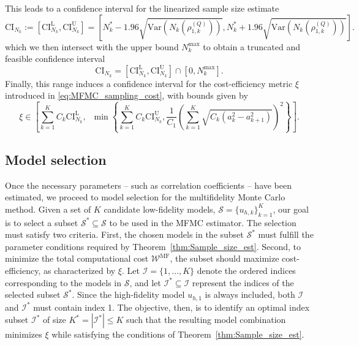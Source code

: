 %
This leads to a confidence interval for the linearized sample size estimate
%
\[
\text{CI}_{N_k} := \left[\text{CI}_{N_k}^{\text{L}},\text{CI}_{N_k}^{\text{U}}\right]=\left[N_k^*-1.96\sqrt{\text{Var}\left(N_k\left(\rho_{1,k}^{(Q)}\right)\right)}, N_k^*+1.96\sqrt{\text{Var}\left(N_k\left(\rho_{1,k}^{(Q)}\right)\right)}\right].
\]
%
which we then intersect with the upper bound $N_k^{\text{max}}$ to obtain a truncated and feasible confidence interval
%
\[
\text{CI}_{N_k} = \left[\text{CI}_{N_k}^{\text{L}},\text{CI}_{N_k}^{\text{U}}\right]\cap \left[0, N_k^{\text{max}}\right].
\]
%
Finally, this range induces a confidence interval for the cost-efficiency metric $\xi$ introduced in \eqref{eq:MFMC_sampling_cost}, with bounds given by
%
\begin{equation}\label{eq:MFMC_sampling_cost_efficiency_CI}
    \xi \in  \left[\sum_{k=1}^K C_k \text{CI}_{N_k}^{\text{L}},\;\;\min \left\{\sum_{k=1}^K C_k \text{CI}_{N_k}^{\text{U}},\frac{1}{C_1} \left(\sum_{k=1}^K\sqrt{C_k\left(a_{k}^2 - a_{k+1}^2\right)}\right)^2\right\}\right].
\end{equation}
%

\subsection{Model selection}\label{sec:Model_Selection}
Once the necessary parameters -- such as correlation coefficients -- have been estimated, we proceed to model selection for the multifidelity Monte Carlo method. Given a set of $K$ candidate low-fidelity models, $\mathcal{S}=\{ u_{h, k}\}_{k=1}^K$, our goal is to select a subset $\mathcal{S}^* \subseteq \mathcal{S}$ to be used in the MFMC estimator. The selection must satisfy two criteria. First, the chosen models in the subset $\mathcal{S}^*$ must fulfill the parameter conditions required by Theorem~\ref{thm:Sample_size_est}. Second, to minimize the total computational cost $\mathcal{W}^{\text{MF}}$, the subset should maximize cost-efficiency, as characterized by $\xi$. Let $\mathcal{I} = \{1,\ldots,K\}$ denote the ordered indices corresponding to the models in $\mathcal{S}$, and let $\mathcal{I}^*\subseteq \mathcal{I}$ represent the indices of the selected subset $\mathcal{S}^*$. Since the high-fidelity model $u_{h,1}$ is always included, both $\mathcal{I}$ and $\mathcal{I}^*$ must contain index 1. The objective, then, is to identify an optimal index subset $\mathcal{I}^*$ of size $K^* = |\mathcal{I}^*| \leq K$ such that the resulting model combination minimizes $\xi$ while satisfying the conditions of Theorem~\ref{thm:Sample_size_est}.


